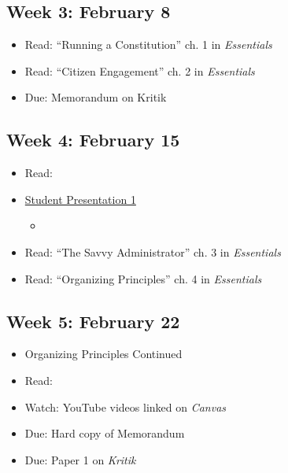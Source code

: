 \documentclass[10pt, letterpaper]{article}
\begin{document}
    \subsection*{Week 3: February 8} 
    \begin{itemize}
        \item Read: ``Running a Constitution'' ch. 1 in \emph{Essentials}
        \item Read: ``Citizen Engagement'' ch. 2 in \emph{Essentials}
        \item Due: Memorandum on Kritik
    \end{itemize}

    \subsection*{Week 4: February 15} 
    \begin{itemize}
        \item Read: \cite{WILSON1887b}
        \item \underline{Student Presentation 1}
        \begin{itemize}
            \item \cite{DESLATTE2020}
        \end{itemize}	
        \item Read: ``The Savvy Administrator'' ch. 3 in \emph{Essentials}
        \item Read: ``Organizing Principles'' ch. 4 in \emph{Essentials}
    \end{itemize}

    \subsection*{Week 5: February 22} 
    \begin{itemize}
        \item Organizing Principles Continued
        \item Read: \cite{SIMON1946}
        \item Watch: YouTube videos linked on \emph{Canvas}
        \item Due: Hard copy of Memorandum
        \item Due: Paper 1 on \emph{Kritik}
    \end{itemize}
\end{document}

